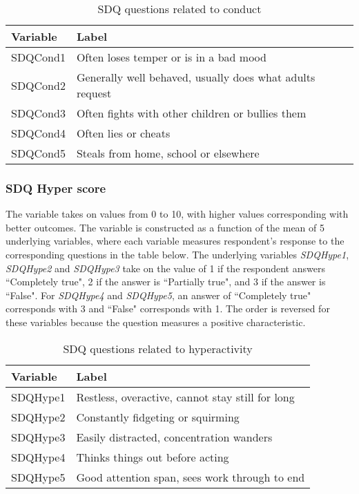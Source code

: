 \begin{table}[H]
\begin{center}
\footnotesize{
\caption{SDQ questions related to conduct}
\begin{tabular}{l l}
\hline
\textbf{Variable} & \textbf{Label} \\
\hline
SDQCond1 & Often loses temper or is in a bad mood\\
SDQCond2 &  Generally well behaved, usually does what adults request \\
SDQCond3 & Often fights with other children or bullies them\\
SDQCond4 & Often lies or cheats\\
SDQCond5 & Steals from home, school or elsewhere\\
\hline
\end{tabular}
}
\end{center}
\end{table}

\subsubsection{SDQ Hyper score}
The variable takes on values from 0 to 10, with higher values corresponding with better outcomes. The variable is constructed as a function of the mean of 5 underlying variables, where each variable measures respondent's response to the corresponding questions in the table below. The underlying variables \textit{SDQHype1}, \textit{SDQHype2} and \textit{SDQHype3} take on the value of 1 if the respondent answers  ``Completely true", 2 if the answer is ``Partially true", and 3 if the answer is ``False". For \textit{SDQHype4} and \textit{SDQHype5}, an answer of ``Completely true" corresponds with 3 and ``False" corresponds with 1. The order is reversed for these variables because the question measures a positive characteristic. \\

\begin{table}[H]
\begin{center}
\footnotesize{
\caption{SDQ questions related to hyperactivity}
\begin{tabular}{l l}
\hline
\textbf{Variable} & \textbf{Label} \\
\hline
SDQHype1 & Restless, overactive, cannot stay still for long\\
SDQHype2 & Constantly fidgeting or squirming\\
SDQHype3 & Easily distracted, concentration wanders\\
SDQHype4 & Thinks things out before acting \\
SDQHype5 & Good attention span, sees work through to end\\
\hline
\end{tabular}
}
\end{center}
\end{table}

